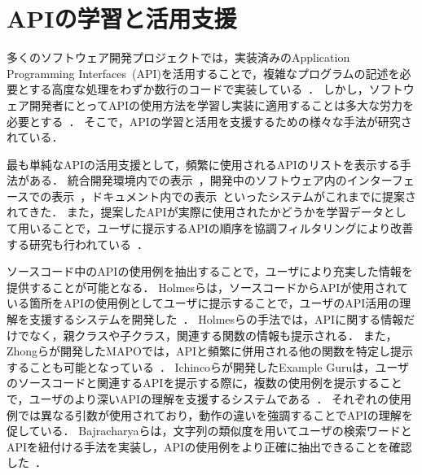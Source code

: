 

\section{APIの学習と活用支援}

多くのソフトウェア開発プロジェクトでは，実装済みのApplication Programming Interfaces~(API)を活用することで，複雑なプログラムの記述を必要とする高度な処理をわずか数行のコードで実装している~\cite{Patterns_for_API_migration}．
しかし，ソフトウェア開発者にとってAPIの使用方法を学習し実装に適用することは多大な労力を必要とする~\cite{robillard2011field}．
そこで，APIの学習と活用を支援するための様々な手法が研究されている．

最も単純なAPIの活用支援として，頻繁に使用されるAPIのリストを表示する手法がある．
統合開発環境内での表示~\cite{Holmes_2008_MSR_Eclipse_APIs}，開発中のソフトウェア内のインターフェースでの表示~\cite{UIST_2009_CommunityCommands}，ドキュメント内での表示~\cite{VLHCC_2009_API_doc_API_usage}といったシステムがこれまでに提案されてきた．
また，提案したAPIが実際に使用されたかどうかを学習データとして用いることで，ユーザに提示するAPIの順序を協調フィルタリングにより改善する研究も行われている~\cite{colab_filtering_api_recommend}．

ソースコード中のAPIの使用例を抽出することで，ユーザにより充実した情報を提供することが可能となる．
Holmesらは，ソースコードからAPIが使用されている箇所をAPIの使用例としてユーザに提示することで，ユーザのAPI活用の理解を支援するシステムを開発した~\cite{Holmes_2006_recommend_api_example}．
Holmesらの手法では，APIに関する情報だけでなく，親クラスや子クラス，関連する関数の情報も提示される．
また，Zhongらが開発したMAPOでは，APIと頻繁に併用される他の関数を特定し提示することも可能となっている~\cite{extended_MAPO}．
Ichincoらが開発したExample Guruは，ユーザのソースコードと関連するAPIを提示する際に，複数の使用例を提示することで，ユーザのより深いAPIの理解を支援するシステムである~\cite{Ichinco_Suggesting_API_Usage}．
それぞれの使用例では異なる引数が使用されており，動作の違いを強調することでAPIの理解を促している．
Bajracharyaらは，文字列の類似度を用いてユーザの検索ワードとAPIを紐付ける手法を実装し，APIの使用例をより正確に抽出できることを確認した~\cite{Bajracharya:2010:LUS}．

